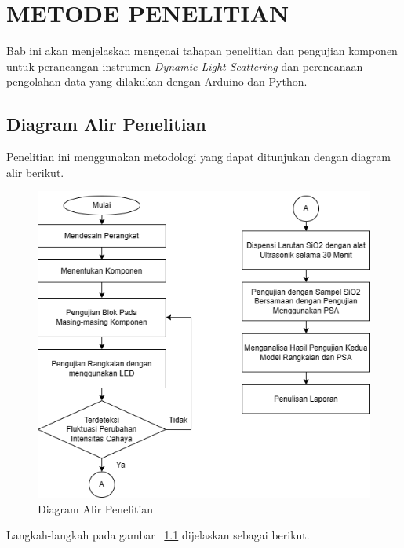 \chapter{METODE PENELITIAN}
Bab ini akan menjelaskan mengenai tahapan penelitian dan pengujian komponen untuk perancangan
instrumen \textit{Dynamic Light Scattering} dan perencanaan pengolahan data yang dilakukan
dengan Arduino dan Python.


\section{Diagram Alir Penelitian}
Penelitian ini menggunakan metodologi yang dapat ditunjukan dengan diagram alir
berikut.

\begin{figure}[H]
    \centering
    \includegraphics[width=12cm]{Images/Skema Penelitian.png}
    \caption{Diagram Alir Penelitian}
    \label{fig:reschart}
\end{figure}
\noindent Langkah-langkah pada gambar ~\ref{fig:reschart} dijelaskan sebagai berikut.

